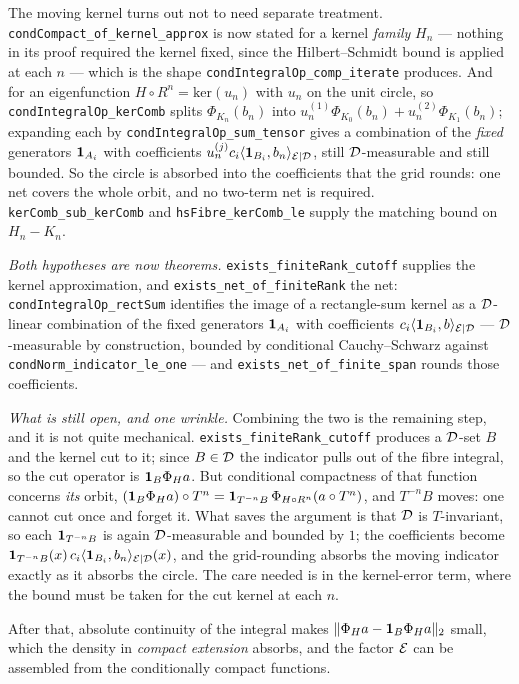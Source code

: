 \begin{remark}
  The moving kernel turns out not to need separate treatment.
  \texttt{condCompact\_of\_kernel\_approx} is now stated for a kernel \emph{family} $H_n$ ---
  nothing in its proof required the kernel fixed, since the Hilbert--Schmidt bound is applied
  at each $n$ --- which is the shape \texttt{condIntegralOp\_comp\_iterate} produces.  And for
  an eigenfunction $H \circ R^n = \mathrm{ker}(u_n)$ with $u_n$ on the unit circle, so
  \texttt{condIntegralOp\_kerComb} splits $\Phi_{K_n}(b_n)$ into
  $u_n^{(1)}\Phi_{K_0}(b_n) + u_n^{(2)}\Phi_{K_1}(b_n)$; expanding each by
  \texttt{condIntegralOp\_sum\_tensor} gives a combination of the \emph{fixed} generators
  $\mathbf{1}_{A_i}$ with coefficients $u_n^{(j)} c_i \langle \mathbf{1}_{B_i}, b_n \rangle_{\mathcal{E} \mid \mathcal{D}}$, still
  $\mathcal{D}$-measurable and still bounded.  So the circle is absorbed into the coefficients that
  the grid rounds: one net covers the whole orbit, and no two-term net is required.
  \texttt{kerComb\_sub\_kerComb} and \texttt{hsFibre\_kerComb\_le} supply the matching bound
  on $H_n - K_n$.

  \smallskip
  \smallskip
  \emph{Both hypotheses are now theorems.}  \texttt{exists\_finiteRank\_cutoff} supplies the
  kernel approximation, and \texttt{exists\_net\_of\_finiteRank} the net:
  \texttt{condIntegralOp\_rectSum} identifies the image of a rectangle-sum kernel as a
  $\mathcal{D}$-linear combination of the fixed generators $\mathbf{1}_{A_i}$ with coefficients
  $c_i \langle \mathbf{1}_{B_i}, b \rangle_{\mathcal{E} \mid \mathcal{D}}$ --- $\mathcal{D}$-measurable by construction, bounded by
  conditional Cauchy--Schwarz against \texttt{condNorm\_indicator\_le\_one} --- and
  \texttt{exists\_net\_of\_finite\_span} rounds those coefficients.

  \smallskip
  \emph{What is still open, and one wrinkle.}  Combining the two is the remaining step, and
  it is not quite mechanical.  \texttt{exists\_finiteRank\_cutoff} produces a $\mathcal{D}$-set $B$
  and the kernel cut to it; since $B \in \mathcal{D}$ the indicator pulls out of the fibre integral,
  so the cut operator is $\mathbf{1}_B \Phi_H a$.  But conditional compactness of that function
  concerns \emph{its} orbit,
  $(\mathbf{1}_B \Phi_H a) \circ T^n = \mathbf{1}_{T^{-n}B}\,\Phi_{H \circ R^n}(a \circ T^n)$, and
  $T^{-n}B$ moves: one cannot cut once and forget it.  What saves the argument is that
  $\mathcal{D}$ is $T$-invariant, so each $\mathbf{1}_{T^{-n}B}$ is again $\mathcal{D}$-measurable and bounded by
  $1$; the coefficients become
  $\mathbf{1}_{T^{-n}B}(x)\, c_i \langle \mathbf{1}_{B_i}, b_n \rangle_{\mathcal{E} \mid \mathcal{D}}(x)$, and the grid-rounding absorbs
  the moving indicator exactly as it absorbs the circle.  The care needed is in the
  kernel-error term, where the bound must be taken for the cut kernel at each $n$.

  After that, absolute continuity of the integral makes
  $\lVert \Phi_H a - \mathbf{1}_B \Phi_H a \rVert_2$ small, which the density in \emph{compact extension}
  absorbs, and the factor $\mathcal{E}$ can be assembled from the conditionally compact
  functions.
\end{remark}

